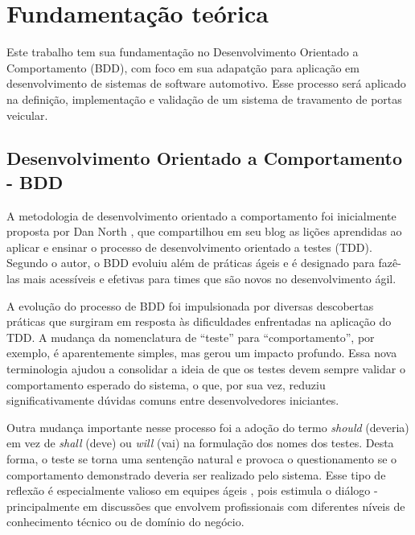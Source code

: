 \chapter{Fundamentação teórica}
\label{ch:te}

Este trabalho tem sua fundamentação no Desenvolvimento Orientado a Comportamento (BDD), com foco em sua adapatção para aplicação em desenvolvimento de sistemas de software automotivo. 
Esse processo será aplicado na definição, implementação e validação de um sistema de travamento de portas veicular.

\section{\textbf{Desenvolvimento Orientado a Comportamento - BDD}}

A metodologia de desenvolvimento orientado a comportamento foi inicialmente proposta por Dan North \cite{north2006bdd}, que compartilhou em seu blog as lições 
aprendidas ao aplicar e ensinar o processo de desenvolvimento orientado a testes (TDD). Segundo o autor, o BDD evoluiu além de práticas ágeis e é designado 
para fazê-las mais acessíveis e efetivas para times que são novos no desenvolvimento ágil.

A evolução do processo de BDD foi impulsionada por diversas descobertas práticas que surgiram em resposta às dificuldades enfrentadas na aplicação do TDD. A mudança 
da nomenclatura de ``teste'' para ``comportamento'', por exemplo, é aparentemente simples, mas gerou um impacto profundo. Essa nova terminologia ajudou a consolidar a 
ideia de que os testes devem sempre validar o comportamento esperado do sistema, o que, por sua vez, reduziu significativamente dúvidas comuns entre desenvolvedores 
iniciantes.

Outra mudança importante nesse processo foi a adoção do termo \textit{should} (deveria) em vez de \textit{shall} (deve) ou \textit{will} (vai) na formulação dos nomes 
dos testes. Desta forma, o teste se torna uma sentenção natural e provoca o questionamento se o comportamento demonstrado deveria ser realizado pelo sistema.  
Esse tipo de reflexão é especialmente valioso em equipes ágeis \cite{atlassianAgileTeams}, pois estimula o diálogo - principalmente em discussões que envolvem 
profissionais com diferentes níveis de conhecimento técnico ou de domínio do negócio.

